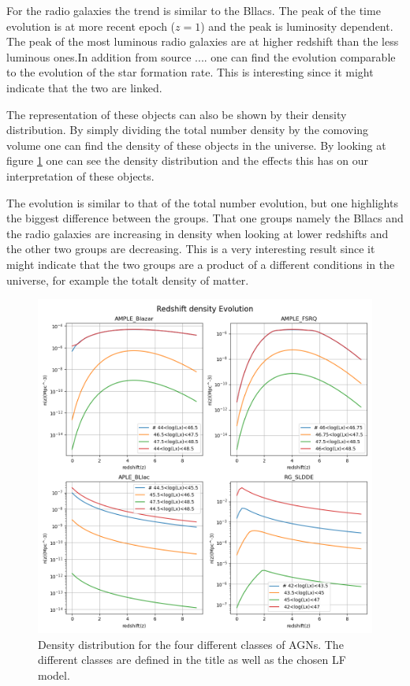 \documentclass{article}
\begin{document}
For the radio galaxies the trend is similar to the Bllacs. The peak of the time evolution is at more recent epoch ($z=1$) and the peak is 
luminosity dependent. The peak of the most luminous radio galaxies are at higher redshift than the less luminous ones.In addition from source .... one can find
the evolution comparable to the evolution of the star formation rate. This is interesting since it might indicate that the two are linked.


The representation of these objects can also be shown by their density distribution. By simply dividing the total number density by the comoving volume one can
find the density of these objects in the universe. By looking at figure \ref{fig:DD} one can see the density distribution and the effects this has on our interpretation of these objects.

The evolution is similar to that of the total number evolution, but one highlights the biggest difference between the groups. That one groups namely the Bllacs and the radio galaxies
are increasing in density when looking at lower redshifts and the other two groups are decreasing. This is a very interesting result since it might indicate that the two groups are 
a product of a different conditions in the universe, for example the totalt density of matter. 



\begin{figure}
    \centering
    \includegraphics[width = \textwidth]{Redshift density Evolution.png}
    \caption{Density distribution for the four different classes of AGNs. The different classes are defined in the title as well as the chosen LF model.}
    \label{fig:DD}
\end{figure}
\end{document}
